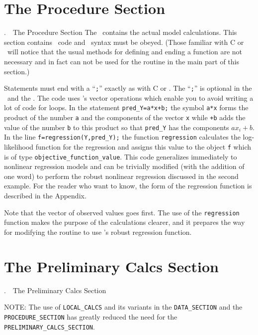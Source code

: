 \documentclass[12pt]{book}
\makeatletter
\def\mysection#1{\section{#1}{\bigbf \medbreak\noindent\number\c@chapter.\number\c@section\ \ #1\medbreak}}
\makeatother
\begin{document}
\mysection{The Procedure Section}
The \PROS\ contains the actual model calculations.
This section contains \cplus\ code and \cplus\ syntax must be obeyed.
(Those familiar with C or \cplus\  will notice that the usual
methods for defining and ending a function are not necessary 
and in fact can not be used for the routine in the main part of this
section.) 
 
Statements must end with a ``{\tt ;}'' exactly as with C or \cplus.  
The ``{\tt ;}'' is
optional in the \DS\ and the \PS.
The code uses \AD's vector operations which enable you to avoid
writing a lot of code for loops.
In the statement {\tt pred\_Y=a*x+b;} the symbol {\tt a*x}
forms the product of the number {\tt a} and the components of the
vector {\tt x} while {\tt +b} adds the value of the number {\tt b}
to this product so that {\tt pred\_Y} has the components 
$ax_i+b$.
In the line {\tt f=regression(Y,pred\_Y);} the function 
{\tt regression} calculates the log-likelihood function for
the regression and assigns this value to the object {\tt f}
which is of type {\tt objective\_function\_value}. 
This code generalizes immediately to
nonlinear regression models and can be trivially
modified (with the addition of one word) to perform the robust nonlinear
regression discussed in the second example. For the reader who want to know,
the form of the regression function is described in the Appendix.  

\noindent Note that the vector of observed values goes first. 
The use of the {\tt regression} function makes the purpose of the
calculations clearer, and it prepares the way for
modifying the routine to use \ADM's robust regression
function.

\mysection{The Preliminary Calcs Section}


NOTE:  The use of {\tt LOCAL\_CALCS} and its variants in the
{\tt DATA\_SECTION} and the {\tt PROCEDURE\_SECTION}  has
greatly reduced the need for the {\tt PRELIMINARY\_CALCS\_SECTION}.
\end{document}
